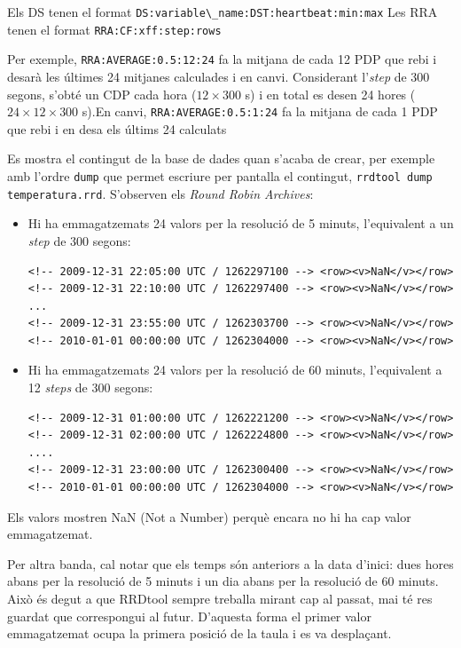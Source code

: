 Els DS tenen el format \verb+DS:variable\_name:DST:heartbeat:min:max+
Les RRA tenen el format \verb+RRA:CF:xff:step:rows+  

Per exemple, \verb+RRA:AVERAGE:0.5:12:24+ fa la mitjana de cada 12 PDP que rebi i desarà les últimes 24 mitjanes calculades i en canvi. Considerant l'\emph{step} de 300 segons, s'obté un CDP cada hora ($12\times300$ s) i en total es desen 24 hores ($24\times12\times300$ s).En canvi, \verb+RRA:AVERAGE:0.5:1:24+ fa la mitjana de cada 1 PDP que rebi i en desa els últims 24 calculats



Es mostra el contingut de la base de dades quan s'acaba de crear, per exemple amb l'ordre \verb+dump+ que permet escriure per pantalla el contingut, \lstinline[style=sh]+rrdtool dump temperatura.rrd+. S'observen els \emph{Round Robin Archives}:
\begin{itemize}
\item Hi ha emmagatzemats 24 valors per la resolució de 5 minuts, l'equivalent a  un \emph{step} de 300 segons:
\begin{lstlisting}
<!-- 2009-12-31 22:05:00 UTC / 1262297100 --> <row><v>NaN</v></row>
<!-- 2009-12-31 22:10:00 UTC / 1262297400 --> <row><v>NaN</v></row>
...
<!-- 2009-12-31 23:55:00 UTC / 1262303700 --> <row><v>NaN</v></row>
<!-- 2010-01-01 00:00:00 UTC / 1262304000 --> <row><v>NaN</v></row>
\end{lstlisting}

\item Hi ha emmagatzemats 24 valors per la resolució de 60 minuts, l'equivalent a 12 \emph{steps} de 300 segons:
\begin{lstlisting}
<!-- 2009-12-31 01:00:00 UTC / 1262221200 --> <row><v>NaN</v></row>
<!-- 2009-12-31 02:00:00 UTC / 1262224800 --> <row><v>NaN</v></row>
....
<!-- 2009-12-31 23:00:00 UTC / 1262300400 --> <row><v>NaN</v></row>
<!-- 2010-01-01 00:00:00 UTC / 1262304000 --> <row><v>NaN</v></row>
\end{lstlisting}
\end{itemize}

Els valors mostren NaN (Not a Number) perquè encara no hi ha cap valor emmagatzemat.

Per altra banda, cal notar que els temps són anteriors a la data d'inici: dues hores abans per la resolució de 5 minuts i un dia abans per la resolució de 60 minuts. Això és degut a que RRDtool sempre treballa mirant cap al passat, mai té res guardat que correspongui al futur.
D'aquesta forma  el primer valor emmagatzemat ocupa la primera posició de la taula i es va desplaçant.

